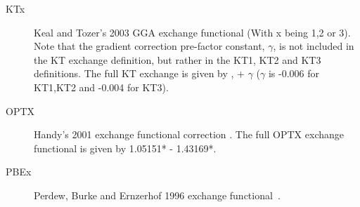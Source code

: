 \begin{description}
\begin{description}






\item[KTx] Keal and Tozer's 2003 GGA exchange functional (With x being 1,2 or 3). Note that the gradient correction pre-factor constant, $\gamma$, is not included in the KT exchange 
  definition, but rather in the KT1, KT2 and KT3 definitions. The full KT exchange is given by \cite{dft:kt12},  + $\gamma$ ($\gamma$ is -0.006 for KT1,KT2 and -0.004 for KT3). 

\item[OPTX] Handy's 2001 exchange functional correction \cite{dft:optx}. The full OPTX exchange functional is given by 1.05151* - 1.43169*.

\item[PBEx] Perdew, Burke and Ernzerhof 1996 exchange functional~\cite{dft:pbe}.



\end{description}
\end{description}
